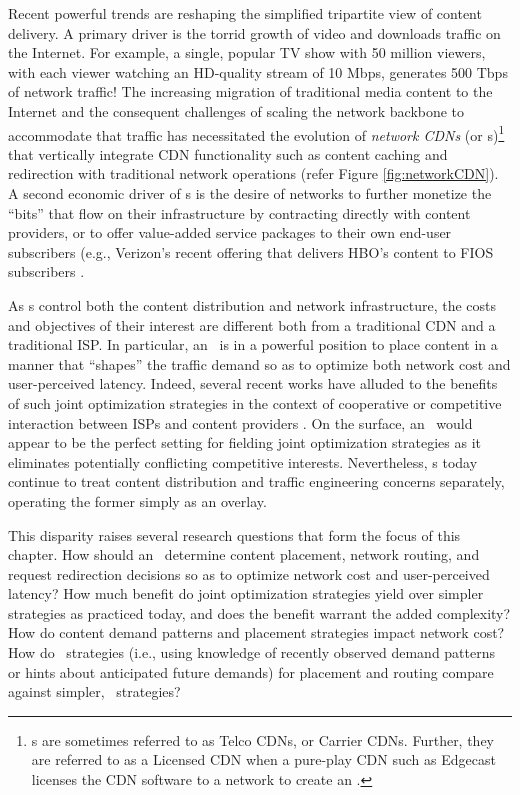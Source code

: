 Recent powerful trends are reshaping the simplified tripartite view of content delivery. A primary driver is the torrid growth of video \cite{nielsen-video-growth,cisco-videogrowth} and downloads traffic on the Internet. For example, a single, popular TV show with 50 million viewers, with each viewer watching an HD-quality stream of 10 Mbps, generates 500 Tbps of network traffic! The increasing migration of traditional media content to the Internet and the consequent challenges of scaling the network backbone to accommodate that traffic has necessitated the evolution of {\em network CDNs} (or \ncp s)\footnote{\ncp s are sometimes referred to as Telco CDNs, or Carrier CDNs. Further, they are referred to as a Licensed CDN when a pure-play CDN such as Edgecast\cite{edgecast} licenses the CDN software to a network to create an \ncp.} that vertically integrate CDN functionality such as content caching and redirection with traditional network operations \cite{hpcdn,telcowhitepaper,level3-cdn,att-cdn,verizon-cdn} (refer Figure \ref{fig:networkCDN}). A second economic driver of \ncp s is the desire of networks to further monetize the ``bits'' that flow on their infrastructure by contracting directly with content providers, or to offer value-added service packages to their own end-user subscribers  (e.g., Verizon's recent offering that delivers HBO's content to FIOS subscribers  \cite{fios}.


As \ncp s control both the content distribution and network infrastructure, the costs and objectives of their interest are different both from a traditional CDN and a traditional ISP. In particular, an \ncp\ is in a powerful position to place content in a manner that ``shapes'' the traffic demand so as to optimize both network cost and user-perceived latency. Indeed, several recent works have alluded to the benefits of such joint optimization strategies in the context of cooperative or competitive interaction between ISPs and content providers \cite{P4P,JohariGameTheory,Jiang2009,catenew}. On the surface, an \ncp\ would appear to be the perfect setting for fielding joint optimization strategies as it eliminates potentially conflicting competitive interests. Nevertheless, \ncp s today continue to treat content distribution and traffic engineering concerns separately, operating the former simply as an overlay.

This disparity raises several research questions that form the focus of this chapter. How should an \ncp\ determine content placement, network routing, and request redirection decisions so as to optimize network cost and user-perceived latency? How much benefit do joint optimization strategies yield over simpler strategies as practiced today, and does the benefit warrant the added complexity?  How do content demand patterns and placement strategies impact network cost?  How do \planned\ strategies (i.e., using knowledge of recently observed demand patterns or hints about anticipated future demands) for placement and routing compare against simpler, \unplanned\ strategies?


